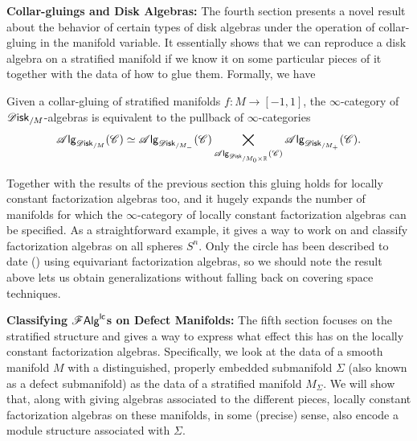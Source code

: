 \documentclass[../text]{subfiles}
\begin{document}
\textbf{ Collar-gluings and Disk Algebras:} The fourth section presents a novel result about the behavior of certain types of disk algebras under the operation of collar-gluing in the manifold variable. It essentially shows that we can reproduce a disk algebra on a stratified manifold if we know it on some particular pieces of it together with the data of how to glue them. Formally, we have
%
\begin{theorem*}[\ref{thm:gluing_alg_disk/M}]
    Given a collar-gluing of stratified manifolds $f: M \rightarrow [-1,1]$, the $\infty$-category of $\disk_{/M}$-algebras is equivalent to the pullback of $\infty$-categories
    \begin{equation}
        \alg{\disk_{/M}} (\catC) \simeq \alg{\disk_{/M_-}} (\catC) \bigtimes_{\alg{\disk_{/M_0 \times \mathbb{R}}} (\catC)} \alg{\disk_{/M_+}} (\catC).
    \end{equation}
\end{theorem*}
%
Together with the results of the previous section this gluing holds for locally constant factorization algebras too, and it hugely expands the number of manifolds for which the $\infty$-category of locally constant factorization algebras can be specified. As a straightforward example, it gives a way to work on and classify factorization algebras on all spheres $S^n$. Only the circle has been described to date (\cite{ginot2015}) using equivariant factorization algebras, so we should note the result above lets us obtain generalizations without falling back on covering space techniques. 

\textbf{ Classifying $\mathscr{F} \mathsf{Alg}^{\mathsf{lc}}$s on Defect Manifolds:} The fifth section focuses on the stratified structure and gives a way to express what effect this has on the locally constant factorization algebras. Specifically, we look at the data of a smooth manifold $M$ with a distinguished, properly embedded submanifold $\Sigma$ (also known as a defect submanifold) as the data of a stratified manifold $M_\Sigma$. We will show that, along with giving algebras associated to the different pieces, locally constant factorization algebras on these manifolds, in some (precise) sense, also encode a module structure associated with $\Sigma$.
\end{document}
